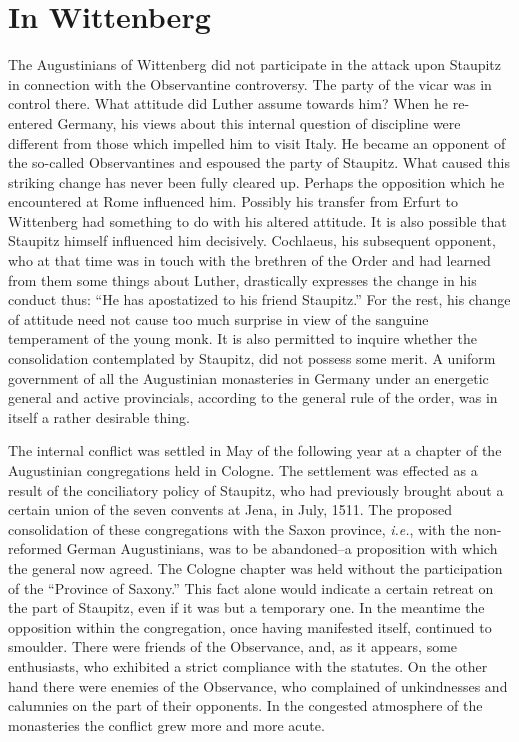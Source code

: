 \section{In Wittenberg}

The Augustinians of Wittenberg did not participate in the attack
upon Staupitz in connection with the Observantine controversy.
The party of the vicar was in control there. What attitude did Luther
assume towards him? When he re-entered Germany, his views about
this internal question of discipline were different from those which
impelled him to visit Italy. He became an opponent of the so-called
Observantines and espoused the party of Staupitz. What caused this
striking change has never been fully cleared up. Perhaps the opposition
which he encountered at Rome influenced him. Possibly his
transfer from Erfurt to Wittenberg had something to do with his
altered attitude. It is also possible that Staupitz himself influenced
him decisively. Cochlaeus, his subsequent opponent, who at that time
was in touch with the brethren of the Order and had learned from
them some things about Luther, drastically expresses the change in
his conduct thus: “He has apostatized to his friend Staupitz.” For
the rest, his change of attitude need not cause too much surprise in
view of the sanguine temperament of the young monk. It is also
permitted to inquire whether the consolidation contemplated by
Staupitz, did not possess some merit. A uniform government of all
the Augustinian monasteries in Germany under an energetic general
and active provincials, according to the general rule of the order,
was in itself a rather desirable thing.

The internal conflict was settled in May of the following year at
a chapter of the Augustinian congregations held in Cologne. The
settlement was effected as a result of the conciliatory policy of Staupitz,
who had previously brought about a certain union of the seven
convents at Jena, in July, 1511. The proposed consolidation of these
congregations with the Saxon province, \textit{i.e.}, with the non-reformed
German Augustinians, was to be abandoned--a proposition with
which the general now agreed. The Cologne chapter was held without
the participation of the “Province of Saxony.” This fact alone
would indicate a certain retreat on the part of Staupitz, even if it
was but a temporary one. In the meantime the opposition within
the congregation, once having manifested itself, continued to smoulder.
There were friends of the Observance, and, as it appears, some
enthusiasts, who exhibited a strict compliance with the statutes. On
the other hand there were enemies of the Observance, who complained
of unkindnesses and calumnies on the part of their opponents. In the
congested atmosphere of the monasteries the conflict grew more and
more acute.

